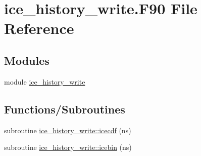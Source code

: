 \hypertarget{ice__history__write_8F90}{
\section{ice\_\-history\_\-write.F90 File Reference}
\label{ice__history__write_8F90}
}
\subsection*{Modules}
\begin{DoxyCompactItemize}
\item 
module \hyperlink{namespaceice__history__write}{ice\_\-history\_\-write}
\end{DoxyCompactItemize}
\subsection*{Functions/Subroutines}
\begin{DoxyCompactItemize}
\item 
subroutine \hyperlink{namespaceice__history__write_af99cb89d79e815ff4c40abdfacc34cf9}{ice\_\-history\_\-write::icecdf} (ns)
\item 
subroutine \hyperlink{namespaceice__history__write_ab76a8fc642cb0db3916e0a9fb6a4d236}{ice\_\-history\_\-write::icebin} (ns)
\end{DoxyCompactItemize}
